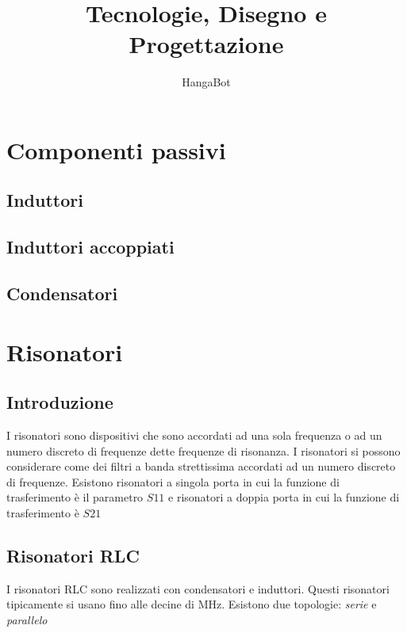 \documentclass[10pt,a4paper]{book}
\author{HangaBot}
\title{Tecnologie, Disegno e Progettazione}
\begin{document}
\maketitle
\tableofcontents

\chapter{Componenti passivi}
\section{Induttori}
\section{Induttori accoppiati}
\section{Condensatori}


\chapter{Risonatori}
\section{Introduzione}
I risonatori sono dispositivi che sono accordati ad una sola frequenza o ad un numero discreto di frequenze dette frequenze di risonanza. I risonatori si possono considerare come dei filtri a banda strettissima accordati ad un numero discreto di frequenze.
Esistono risonatori a singola porta in cui la funzione di trasferimento è il parametro $S11$ e risonatori a doppia porta in cui la funzione di trasferimento è $S21$
\section{Risonatori RLC}
I risonatori RLC sono realizzati con condensatori e induttori. Questi risonatori tipicamente si usano fino alle decine di MHz. Esistono due topologie: \emph{serie} e \emph{parallelo}
\end{document}
